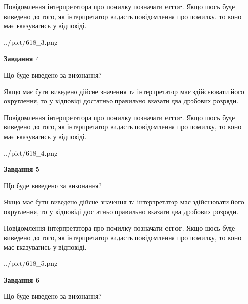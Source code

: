 \documentclass[12pt, ukrainian]{article}
\begin{document}
{\begin {Large}
Повідомлення інтерпретатора про помилку позначати \textbf{error}.
Якщо щось буде виведено до того, як інтерпретатор видасть повідомлення про помилку, 
то воно має вказуватись у відповіді. \par

\begin{center}
	{../pict/618_3.png}
\end{center}
\newpage

{\begin {center}\textbf{Завдання 4}\end {center}}\par
Що буде виведено за виконання? \par

Якщо має бути виведено дійсне значення та інтерпретатор має здійснювати його округлення, 
то у відповіді достатньо правильно вказати два дробових розряди.

Повідомлення інтерпретатора про помилку позначати \textbf{error}.
Якщо щось буде виведено до того, як інтерпретатор видасть повідомлення про помилку, 
то воно має вказуватись у відповіді. \par

\begin{center}
	{../pict/618_4.png}
\end{center}
\newpage

{\begin {center}\textbf{Завдання 5}\end {center}}\par
Що буде виведено за виконання? \par

Якщо має бути виведено дійсне значення та інтерпретатор має здійснювати його округлення, 
то у відповіді достатньо правильно вказати два дробових розряди.

Повідомлення інтерпретатора про помилку позначати \textbf{error}.
Якщо щось буде виведено до того, як інтерпретатор видасть повідомлення про помилку, 
то воно має вказуватись у відповіді. \par

\begin{center}
	{../pict/618_5.png}
\end{center}
\newpage

{\begin {center}\textbf{Завдання 6}\end {center}}\par
Що буде виведено за виконання? \par


\end{Large}}
\end{document}

